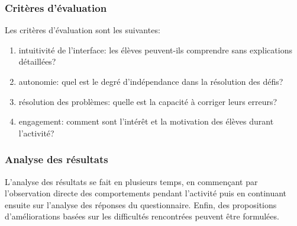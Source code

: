 \subsubsection{Critères d’évaluation}
Les critères d'évaluation sont les suivantes:
\begin{enumerate}
    \item intuitivité de l'interface: les élèves peuvent-ils comprendre sans explications détaillées?
    \item autonomie: quel est le degré d'indépendance dans la résolution des défis?
    \item résolution des problèmes: quelle est la capacité à corriger leurs erreurs?
    \item engagement: comment sont l'intérêt et la motivation des élèves durant l'activité?
\end{enumerate}

\subsubsection{Analyse des résultats}
L'analyse des résultats se fait en plusieurs temps, en commençant par l'observation directe des comportements pendant l'activité puis en continuant ensuite sur l'analyse des réponses du questionnaire.
Enfin, des propositions d'améliorations basées sur les difficultés rencontrées peuvent être formulées.
